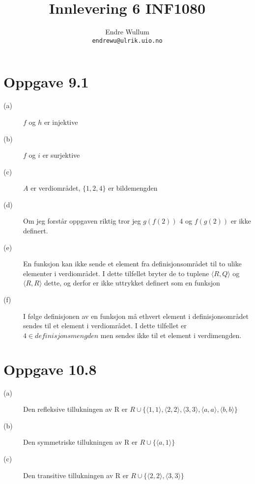 \documentclass[12pt,norsk,a4paper]{article}
\title{Innlevering 6 INF1080}
\author{Endre Wullum\\ \texttt{endrewu@ulrik.uio.no}}
\begin{document}
\maketitle

\section*{Oppgave 9.1}
\begin{description}
\item[(a)]$f$ og $h$ er injektive
\item[(b)]$f$ og $i$ er surjektive
\item[(c)]$A$ er verdiområdet, $\{1, 2, 4\}$ er bildemengden
\item[(d)]Om jeg forstår oppgaven riktig tror jeg $g(f(2))$ 4 og $f(g(2))$ er ikke definert.
\item[(e)]En funksjon kan ikke sende et element fra definisjonsområdet til to ulike elementer i verdiområdet. I dette tilfellet bryter de to tuplene $\langle R,Q\rangle$ og $\langle R,R\rangle$ dette, og derfor er ikke uttrykket definert som en funksjon
\item[(f)] I følge definisjonen av en funksjon må ethvert element i definisjonsområdet sendes til et element i verdiområdet. I dette tilfellet er $4\in definisjonsmengden$ men sendes ikke til et element i verdimengden.
\end{description}

\section*{Oppgave 10.8}
\begin{description}
\item[(a)]Den refleksive tillukningen av R er $R \cup \{\langle 1,1\rangle,\langle 2,2\rangle,\langle 3,3\rangle,\langle a,a\rangle,\langle b,b\rangle\}$
\item[(b)]Den symmetriske tillukningen av R er $R \cup \{\langle a,1\rangle\}$
\item[(c)]Den transitive tillukningen av R er $R \cup \{\langle 2,2\rangle,\langle 3,3\rangle\}$
\end{description}


\end{document}
